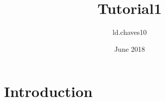 \documentclass{article}
\title{Tutorial1}
\author{ld.chaves10 }
\date{June 2018}
\begin{document}
\maketitle

\section{Introduction}
\end{document}
